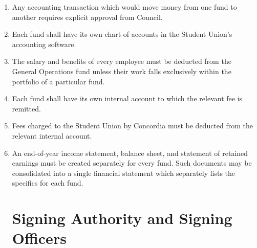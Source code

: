 \documentclass[oneside]{book}
\begin{document}
\begin{enumerate}
\item Any accounting transaction which would move money from one fund to another requires explicit approval from Council.
\item Each fund shall have its own chart of accounts in the Student Union’s accounting software. 
\item The salary and benefits of every employee must be deducted from the General Operations fund unless their work falls exclusively within the portfolio of a particular fund. 
\item Each fund shall have its own internal account to which the relevant fee is remitted. 
\item Fees charged to the Student Union by Concordia must be deducted from the relevant internal account.
\item An end-of-year income statement, balance sheet, and statement of retained earnings must be created separately for every fund. Such documents may be consolidated into a single financial statement which separately lists the specifics for each fund. 

\chapter{\label{Signing_Authority_and_Signing_Officers}Signing Authority and Signing Officers}


\end{enumerate}
\end{document}
